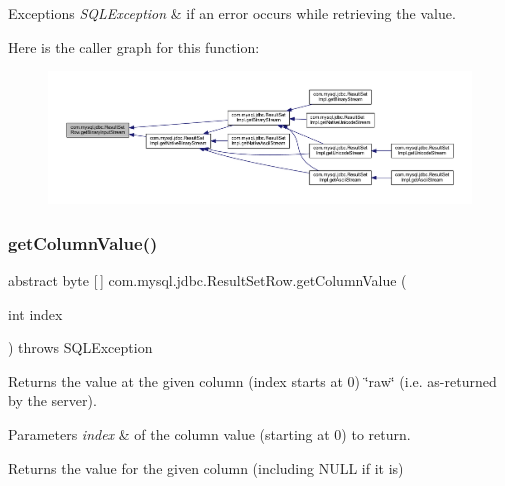 \begin{DoxyExceptions}{Exceptions}
{\em S\+Q\+L\+Exception} & if an error occurs while retrieving the value. \\
\hline
\end{DoxyExceptions}
Here is the caller graph for this function\+:
\nopagebreak
\begin{figure}[H]
\begin{center}
\leavevmode
\includegraphics[width=350pt]{classcom_1_1mysql_1_1jdbc_1_1_result_set_row_a48ff052b76ef93e6dbd945e75639e995_icgraph}
\end{center}
\end{figure}
\mbox{\label{classcom_1_1mysql_1_1jdbc_1_1_result_set_row_a5213f1db94bbf4bbd98c5141aff51fb8}} 
\subsubsection{\texorpdfstring{get\+Column\+Value()}{getColumnValue()}}
{\footnotesize\ttfamily abstract byte \mbox{[}$\,$\mbox{]} com.\+mysql.\+jdbc.\+Result\+Set\+Row.\+get\+Column\+Value (\begin{DoxyParamCaption}\item[{int}]{index }\end{DoxyParamCaption}) throws S\+Q\+L\+Exception\hspace{0.3cm}{\ttfamily [abstract]}}

Returns the value at the given column (index starts at 0) \char`\"{}raw\char`\"{} (i.\+e. as-\/returned by the server).


\begin{DoxyParams}{Parameters}
{\em index} & of the column value (starting at 0) to return. \\
\hline
\end{DoxyParams}
\begin{DoxyReturn}{Returns}
the value for the given column (including N\+U\+LL if it is) 
\end{DoxyReturn}

